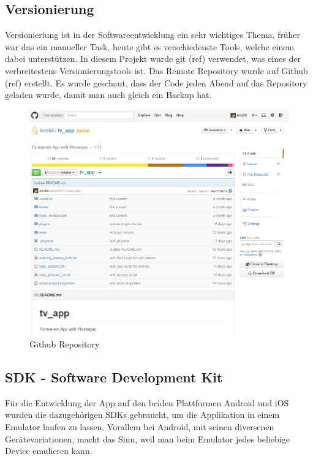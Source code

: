 \subsection{Versionierung}
Versionieriung ist in der Softwareentwicklung ein sehr wichtiges Thema, früher war das ein manueller Task, heute gibt es verschiedenste Tools, welche einem dabei unterstützen. In diesem Projekt wurde git (ref) verwendet, was eines der verbreitestens Versionierungstools ist. Das Remote Repository wurde auf Github (ref) erstellt. Es wurde geschaut, dass der Code jeden Abend auf das Repository geladen wurde, damit man auch gleich ein Backup hat.

\begin{figure}[h]
\centering
\includegraphics[scale=0.5]{images/github.png}
\caption{Github Repository}
\label{fig:github_repo}
\end{figure}

\newpage
\subsection{SDK - Software Development Kit}
Für die Entwicklung der App auf den beiden Plattformen Android und iOS wurden die dazugehörigen SDKs gebraucht, um die Applikation in einem Emulator laufen zu lassen. Vorallem bei Android, mit seinen diversenen Gerätevariationen, macht das Sinn, weil man beim Emulator jedes beliebige Device emulieren kann.

